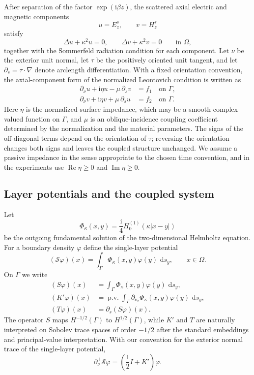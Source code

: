 \documentclass[11pt]{article}
\numberwithin{equation}{section}
\newcommand{\ii}{\mathrm{i}}
\newcommand{\dd}{\,\mathrm{d}}
\begin{document}
After separation of the factor $\exp(\ii\beta z)$, the scattered axial electric and magnetic components
\[
u=E_z^s,\qquad v=H_z^s
\]
satisfy
\begin{equation}
\Delta u+\kappa^2u=0,\qquad \Delta v+\kappa^2v=0\qquad \text{in }\Omega,
\label{eq:helmholtz}
\end{equation}
together with the Sommerfeld radiation condition for each component. Let $\nu$ be the exterior unit normal, let $\tau$ be the positively oriented unit tangent, and let $\partial_s=\tau\cdot\nabla$ denote arclength differentiation. With a fixed orientation convention, the axial-component form of the normalized Leontovich condition is written as
\begin{align}
\partial_\nu u+\ii\eta u-\mu\,\partial_s v&=f_1 \quad \text{on }\Gamma, \label{eq:bc1}\\
\partial_\nu v+\ii\eta v+\mu\,\partial_s u&=f_2 \quad \text{on }\Gamma. \label{eq:bc2}
\end{align}
Here $\eta$ is the normalized surface impedance, which may be a smooth complex-valued function on $\Gamma$, and $\mu$ is an oblique-incidence coupling coefficient determined by the normalization and the material parameters. The signs of the off-diagonal terms depend on the orientation of $\tau$; reversing the orientation changes both signs and leaves the coupled structure unchanged. We assume a passive impedance in the sense appropriate to the chosen time convention, and in the experiments use $\operatorname{Re}\eta\ge0$ and $\operatorname{Im}\eta\ge0$.

\subsection{Layer potentials and the coupled system}

Let
\begin{equation}
\Phi_\kappa(x,y)=\frac{\ii}{4}H_0^{(1)}(\kappa |x-y|)
\end{equation}
be the outgoing fundamental solution of the two-dimensional Helmholtz equation. For a boundary density $\varphi$ define the single-layer potential
\begin{equation}
(\mathcal S\varphi)(x)=\int_\Gamma \Phi_\kappa(x,y)\varphi(y)\,\dd s_y,\qquad x\in\Omega.
\end{equation}
On $\Gamma$ we write
\begin{align}
(S\varphi)(x)&=\int_\Gamma \Phi_\kappa(x,y)\varphi(y)\,\dd s_y,\\
(K'\varphi)(x)&=\operatorname{p.v.}\int_\Gamma \partial_{\nu_x}\Phi_\kappa(x,y)\varphi(y)\,\dd s_y,\\
(T\varphi)(x)&=\partial_s(S\varphi)(x).
\end{align}
The operator $S$ maps $H^{-1/2}(\Gamma)$ to $H^{1/2}(\Gamma)$, while $K'$ and $T$ are naturally interpreted on Sobolev trace spaces of order $-1/2$ after the standard embeddings and principal-value interpretation. With our convention for the exterior normal trace of the single-layer potential,
\begin{equation}
\partial_\nu^+\mathcal S\varphi=\left(\frac12 I+K'\right)\varphi .
\end{equation}
\end{document}
